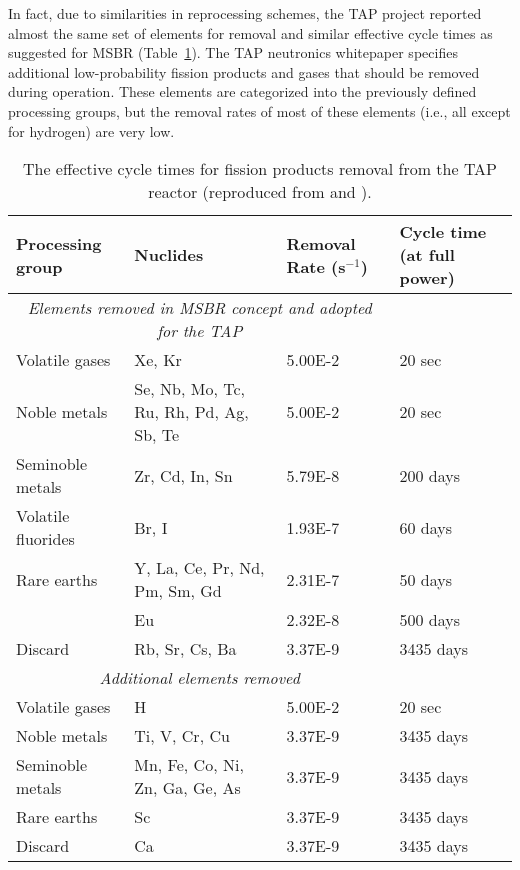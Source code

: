 In fact, due to similarities in reprocessing schemes, the \gls{TAP} project 
reported almost the same set of elements for removal and similar effective 
cycle times as suggested for \gls{MSBR} (Table~\ref{tab:reprocessing_list}). 
The \gls{TAP} neutronics whitepaper specifies additional low-probability 
fission products and gases that should be removed during operation. These 
elements are categorized into the previously defined processing groups, but 
the removal rates of most of these elements (i.e., all except for hydrogen) 
are very low.
\begin{table}[ht!]
	\centering
	\caption{The effective cycle times for fission products removal  from the 
	\gls{TAP} reactor (reproduced from \cite{betzler_implementation_2017} and 
	\cite{transatomic_power_corporation_neutronics_2016}).}
	\begin{tabular}{p{} p{} p{} 
	p{}}
		\hline 
		Processing group & \qquad\qquad\qquad Nuclides & Removal Rate 
		(s$^{-1}$) & Cycle time (at full power) \\ [5pt] \hline 
		\multicolumn{3}{c}{\textit{Elements removed in \gls{MSBR} concept and 
		adopted for the \gls{TAP}} \cite{robertson_conceptual_1971}} \\
		Volatile gases & Xe, Kr								  & 5.00E-2 & 20 
		sec \\ [5pt]
		Noble metals & Se, Nb, Mo, Tc, Ru, Rh, Pd, Ag, Sb, Te & 5.00E-2 & 20 
		sec \\ [5pt]
		Seminoble metals & Zr, Cd, In, Sn	  				  & 5.79E-8 & 200 
		days \\ [5pt]
		Volatile fluorides & Br, I 							  & 1.93E-7 & 60 
		days \\ [5pt]
		Rare earths & Y, La, Ce, Pr, Nd, Pm, Sm, Gd           & 2.31E-7 & 50 
		days \\ [5pt]
		\qquad & Eu & 2.32E-8 & 500 days \\ [5pt]
		Discard & Rb, Sr, Cs, Ba & 3.37E-9 & 3435 days \\ [5pt] 
		\hline
		
		\multicolumn{3}{c}{\textit{Additional elements removed} 
		\cite{transatomic_power_corporation_neutronics_2016, 
		betzler_implementation_2017}  } \\
		Volatile gases & H								  	& 5.00E-2 & 20 
		sec    \\ [5pt]
		Noble metals & Ti, V, Cr, Cu						& 3.37E-9 & 3435 
		days \\ [5pt]
		Seminoble metals & Mn, Fe, Co, Ni, Zn, Ga, Ge, As   & 3.37E-9 & 3435 
		days \\ [5pt]
		Rare earths & Sc									& 3.37E-9 & 3435 
		days \\ [5pt]
		Discard & Ca										& 3.37E-9 & 3435 
		days \\ [5pt] 
		\hline
	\end{tabular}
	\label{tab:reprocessing_list}
	\vspace{-0.9em}
\end{table}

